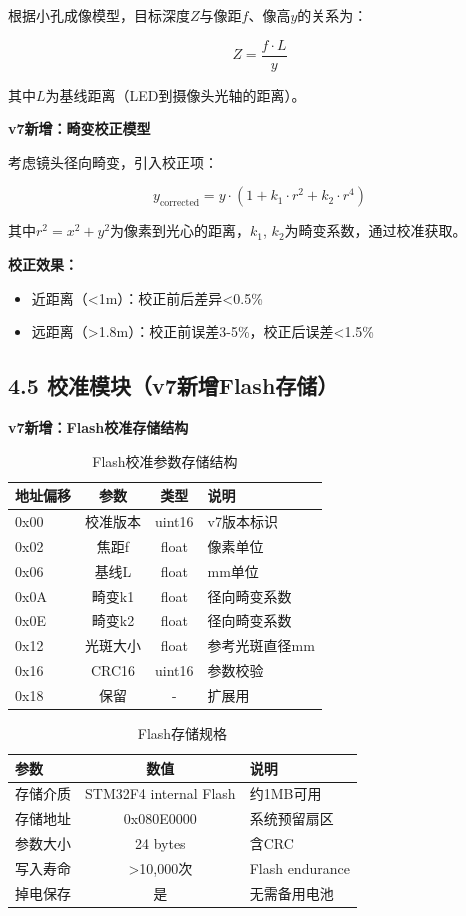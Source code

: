 \documentclass[12pt,a4paper]{article}
\begin{document}
根据小孔成像模型，目标深度$Z$与像距$f$、像高$y$的关系为：

\begin{equation*}
Z = \frac{f \cdot L}{y}
\end{equation*}

其中$L$为基线距离（LED到摄像头光轴的距离）。

\textbf{v7新增：畸变校正模型}

考虑镜头径向畸变，引入校正项：

\begin{equation*}
y_{\text{corrected}} = y \cdot (1 + k_1 \cdot r^2 + k_2 \cdot r^4)
\end{equation*}

其中$r^2 = x^2 + y^2$为像素到光心的距离，$k_1$, $k_2$为畸变系数，通过校准获取。

\textbf{校正效果：}
\begin{itemize}
\item 近距离（<1m）：校正前后差异<0.5\%
\item 远距离（>1.8m）：校正前误差3-5\%，校正后误差<1.5\%
\end{itemize}

\subsection{4.5 校准模块（v7新增Flash存储）}

\textbf{v7新增：Flash校准存储结构}

\begin{table}[H]
\centering
\caption{Flash校准参数存储结构}
\begin{tabular}{lccl}
\toprule
地址偏移 & 参数 & 类型 & 说明 \\
\midrule
0x00 & 校准版本 & uint16 & v7版本标识 \\
0x02 & 焦距f & float & 像素单位 \\
0x06 & 基线L & float & mm单位 \\
0x0A & 畸变k1 & float & 径向畸变系数 \\
0x0E & 畸变k2 & float & 径向畸变系数 \\
0x12 & 光斑大小 & float & 参考光斑直径mm \\
0x16 & CRC16 & uint16 & 参数校验 \\
0x18 & 保留 & - & 扩展用 \\
\bottomrule
\end{tabular}
\end{table}

\begin{table}[H]
\centering
\caption{Flash存储规格}
\begin{tabular}{lcl}
\toprule
参数 & 数值 & 说明 \\
\midrule
存储介质 & STM32F4 internal Flash & 约1MB可用 \\
存储地址 & 0x080E0000 & 系统预留扇区 \\
参数大小 & 24 bytes & 含CRC \\
写入寿命 & >10,000次 & Flash endurance \\
掉电保存 & 是 & 无需备用电池 \\
\bottomrule
\end{tabular}
\end{table}
\end{document}
